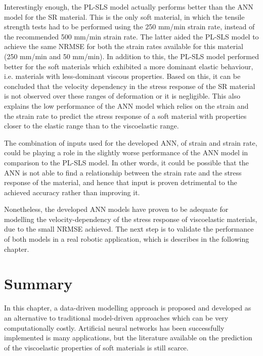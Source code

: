 Interestingly enough, the PL-SLS model actually performs better than the ANN model for the SR material. This is the only soft material, in which the tensile strength tests had to be performed using the 250 mm/min strain rate, instead of the recommended 500 mm/min strain rate. The latter aided the PL-SLS model to achieve the same NRMSE for both the strain rates available for this material (250 mm/min and 50 mm/min). In addition to this, the PL-SLS model performed better for the soft materials which exhibited a more dominant elastic behaviour, i.e. materials with less-dominant viscous properties. Based on this, it can be concluded that the velocity dependency in the stress response of the SR material is not observed over these ranges of deformation or it is negligible. This also explains the low performance of the ANN model which relies on the strain and the strain rate to predict the stress response of a soft material with properties closer to the elastic range than to the viscoelastic range.

The combination of inputs used for the developed ANN, of strain and strain rate, could be playing a role in the slightly worse performance of the ANN model in comparison to the PL-SLS model. In other words, it could be possible that the ANN is not able to find a relationship between the strain rate and the stress response of the material, and hence that input is proven detrimental to the achieved accuracy rather than improving it.

Nonetheless, the developed ANN models have proven to be adequate for modelling the velocity-dependency of the stress response of viscoelastic materials, due to the small NRMSE achieved. The next step is to validate the performance of both models in a real robotic application, which is describes in the following chapter.

\section{Summary}


In this chapter, a data-driven modelling approach is proposed and developed as an alternative to traditional model-driven approaches which can be very computationally costly. Artificial neural networks has been successfully implemented is many applications, but the literature available on the prediction of the viscoelastic properties of soft materials is still scarce. 

